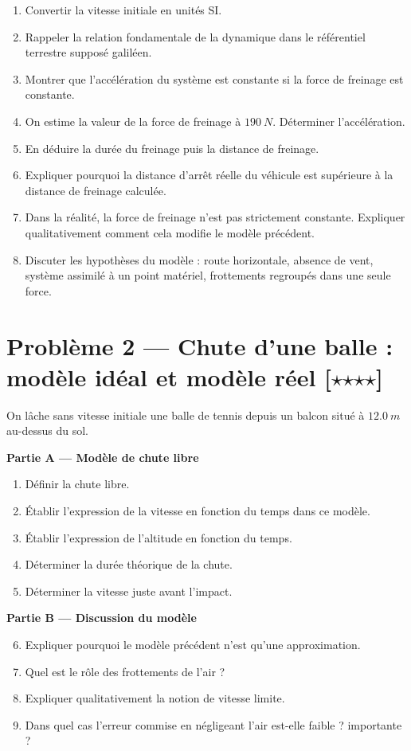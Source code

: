 \documentclass[11pt,a4paper]{article}
\newcommand{\etoile}{\ensuremath{\star}}
\begin{document}
\begin{enumerate}[label=\arabic*)]
    \item Convertir la vitesse initiale en unités SI.
    \item Rappeler la relation fondamentale de la dynamique dans le référentiel terrestre supposé galiléen.
    \item Montrer que l'accélération du système est constante si la force de freinage est constante.
    \item On estime la valeur de la force de freinage à $\SI{190}{N}$. Déterminer l'accélération.
    \item En déduire la durée du freinage puis la distance de freinage.
    \item Expliquer pourquoi la distance d'arrêt réelle du véhicule est supérieure à la distance de freinage calculée.
    \item Dans la réalité, la force de freinage n'est pas strictement constante. Expliquer qualitativement comment cela modifie le modèle précédent.
    \item Discuter les hypothèses du modèle : route horizontale, absence de vent, système assimilé à un point matériel, frottements regroupés dans une seule force.
\end{enumerate}

\section*{Problème 2 --- Chute d'une balle : modèle idéal et modèle réel \hfill [\etoile\etoile\etoile\etoile]}

On lâche sans vitesse initiale une balle de tennis depuis un balcon situé à $\SI{12,0}{m}$ au-dessus du sol.

\textbf{Partie A --- Modèle de chute libre}
\begin{enumerate}[label=\arabic*)]
    \item Définir la chute libre.
    \item Établir l'expression de la vitesse en fonction du temps dans ce modèle.
    \item Établir l'expression de l'altitude en fonction du temps.
    \item Déterminer la durée théorique de la chute.
    \item Déterminer la vitesse juste avant l'impact.
\end{enumerate}

\textbf{Partie B --- Discussion du modèle}
\begin{enumerate}[label=\arabic*)]
    \setcounter{enumi}{5}
    \item Expliquer pourquoi le modèle précédent n'est qu'une approximation.
    \item Quel est le rôle des frottements de l'air ?
    \item Expliquer qualitativement la notion de vitesse limite.
    \item Dans quel cas l'erreur commise en négligeant l'air est-elle faible ? importante ?
\end{enumerate}
\end{document}
